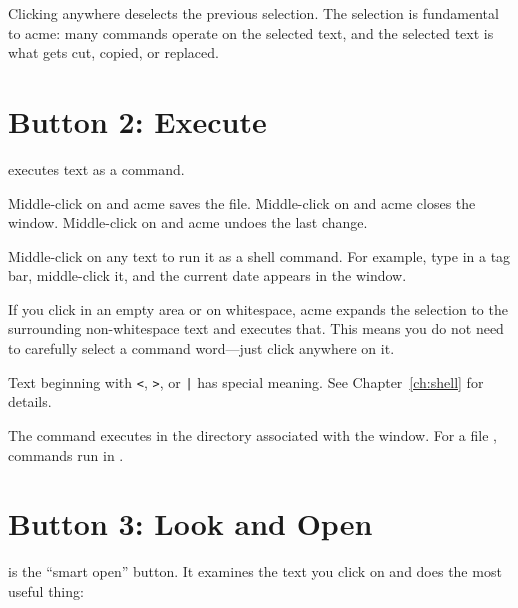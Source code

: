 Clicking  anywhere deselects the previous selection.  The
selection is fundamental to acme: many commands operate on the selected
text, and the selected text is what gets cut, copied, or replaced.

\section{Button 2: Execute}
\label{sec:b2}


 executes text as a command.

\begin{description}[style=nextline]
\item[Click on a built-in command]
Middle-click on  and acme saves the file.  Middle-click on
 and acme closes the window.  Middle-click on 
and acme undoes the last change.

\item[Click on arbitrary text]
Middle-click on any text to run it as a shell command.  For example,
type  in a tag bar, middle-click it, and the current date
appears in the  window.

\item[Click on a blank area]
If you click in an empty area or on whitespace, acme expands the
selection to the surrounding non-whitespace text and executes that.
This means you do not need to carefully select a command word---just
click anywhere on it.

\item[Click on a pipe command]
Text beginning with \texttt{<}, \texttt{>}, or \texttt{|} has special
meaning.  See Chapter~\ref{ch:shell} for details.
\end{description}

The command executes in the directory associated with the window.  For a
file , commands run in
.

\section{Button 3: Look and Open}
\label{sec:b3}


 is the ``smart open'' button.  It examines the text you
click on and does the most useful thing:

